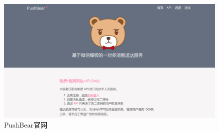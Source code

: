 \begin{figure}[htbp]

\centering
\begin{minipage}{0.76\textwidth}

    \includegraphics[width=1\textwidth]{../img/pushbear.png}
    \caption{PushBear官网}
    \label{fig:pushbear}

\end{minipage} \hfill
\begin{minipage}{0.22\textwidth}


\end{minipage}
\end{figure}
